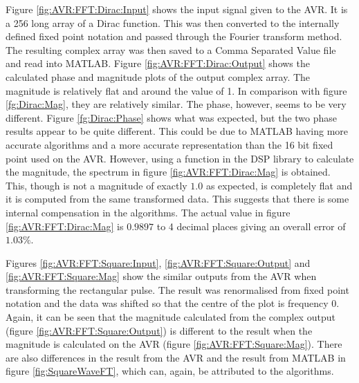 Figure \ref{fig:AVR:FFT:Dirac:Input} shows the input signal given to the AVR. It is a 256 long array of a Dirac function. This was then converted to the internally defined fixed point notation and passed through the Fourier transform method. The resulting complex array was then saved to a Comma Separated Value file and read into MATLAB. Figure \ref{fig:AVR:FFT:Dirac:Output} shows the calculated phase and magnitude plots of the output complex array. The magnitude is relatively flat and around the value of 1. In comparison with figure \ref{fg:Dirac:Mag}, they are relatively similar. The phase, however, seems to be very different. Figure \ref{fg:Dirac:Phase} shows what was expected, but the two phase results appear to be quite different. This could be due to MATLAB having more accurate algorithms and a more accurate representation than the 16 bit fixed point used on the AVR. However, using a function in the DSP library to calculate the magnitude, the spectrum in figure \ref{fig:AVR:FFT:Dirac:Mag} is obtained. This, though is not a magnitude of exactly $1.0$ as expected, is completely flat and it is computed from the same transformed data. This suggests that there is some internal compensation in the algorithms. The actual value in figure \ref{fig:AVR:FFT:Dirac:Mag} is $0.9897$ to 4 decimal places giving an overall error of $1.03\%$. 

Figures \ref{fig:AVR:FFT:Square:Input}, \ref{fig:AVR:FFT:Square:Output} and \ref{fig:AVR:FFT:Square:Mag} show the similar outputs from the AVR when transforming the rectangular pulse. The result was renormalised from fixed point notation and the data was shifted so that the centre of the plot is frequency 0.  Again, it can be seen that the magnitude calculated from the complex output (figure \ref{fig:AVR:FFT:Square:Output}) is different to the result when the magnitude is calculated on the AVR (figure \ref{fig:AVR:FFT:Square:Mag}). There are also differences in the result from the AVR and the result from MATLAB in figure \ref{fig:SquareWaveFT}, which can, again, be attributed to the algorithms. 

